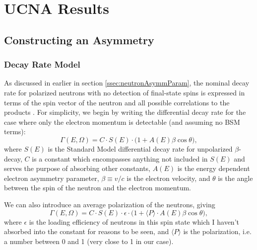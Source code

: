\chapter{UCNA Results}
\label{ch:UCNA_Results}


\section{Constructing an Asymmetry} \label{sec:asymmetry}

\subsection{Decay Rate Model}
As discussed in earlier in section \ref{ssec:neutronAsymmParam},
the nominal decay rate for polarized neutrons with no detection of
final-state spins is expressed in terms of the spin
vector of the neutron and all possible correlations to the products \cite{jackson1957a}.
For simplicity,
we begin by writing the differential decay rate for the case where only the electron
momentum is detectable (and assuming no BSM terms): 
%
\begin{equation} \label{eq:simpleRate}
\Gamma\left(E,\Omega\right)=C \cdot S(E) \cdot \big( 1+A(E)\beta\cos\theta \big),
\end{equation}
%
\noindent where $S(E)$ is the Standard Model differential decay rate for unpolarized
$\beta$-decay, $C$
is a constant which encompasses anything not included in $S(E)$ and serves the 
purpose of absorbing other constants, $A(E)$ is the 
energy dependent electron asymmetry parameter, $\beta\equiv v/c$ is the electron
velocity, and 
$\theta$ is the angle between the spin of the neutron and the electron momentum.

We can also introduce an average polarization of the neutrons, giving
%
\begin{equation}
  \Gamma\left(E,\Omega\right)=C \cdot S(E) \cdot \epsilon \cdot
  \big( 1+ \langle P \rangle\cdot A(E)\beta\cos\theta \big),
\end{equation}
%
\noindent where $\epsilon$ is the loading efficiency of neutrons
in this spin state which I haven't absorbed
into the constant for reasons to be seen, and 
$\langle P \rangle$ is the polarization, i.e. a number between 0 and 1 (very close to 1
in our case).

